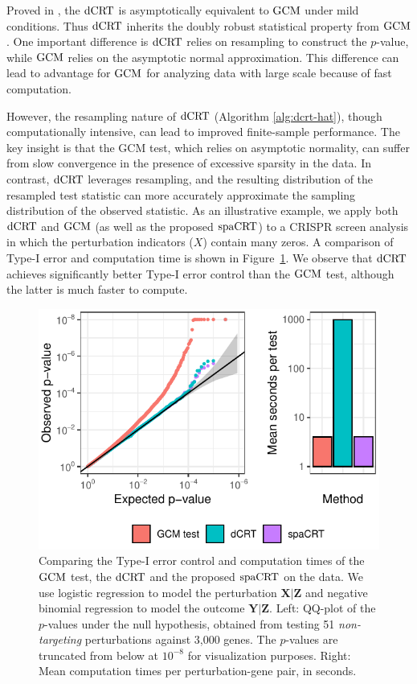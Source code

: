 \documentclass[12pt]{article}
\theoremstyle{definition}
\newcommand{\prx}{\bm X}								%
\newcommand{\prz}{\bm Z}								%
\newcommand{\pry}{{\bm Y}}								%
\newcommand{\dCRT}{\textnormal{dCRT}} 					%
\newcommand{\GCM}{\textnormal{GCM}}						%
\newcommand{\spacrt}{\textnormal{spaCRT}}               %
\begin{document}
Proved in \citet{Niu2022a}, the $\dCRT$ is asymptotically equivalent to $\GCM$ under mild conditions. Thus $\dCRT$ inherits the doubly robust statistical property from $\GCM$. One important difference is $\dCRT$ relies on resampling to construct the $p$-value, while $\GCM$ relies on the asymptotic normal approximation. This difference can lead to advantage for $\GCM$ for analyzing data with large scale because of fast computation. 

However, the resampling nature of $\dCRT$ (Algorithm \ref{alg:dcrt-hat}), though computationally intensive, can lead to improved finite-sample performance. The key insight is that the GCM test, which relies on asymptotic normality, can suffer from slow convergence in the presence of excessive sparsity in the data. In contrast, $\dCRT$ leverages resampling, and the resulting distribution of the resampled test statistic can more accurately approximate the sampling distribution of the observed statistic. As an illustrative example, we apply both $\dCRT$ and $\GCM$ (as well as the proposed $\spacrt$) to a CRISPR screen analysis in which the perturbation indicators ($X$) contain many zeros. A comparison of Type-I error and computation time is shown in Figure~\ref{fig:dCRT_GCM_binomial_poisson}. We observe that $\dCRT$ achieves significantly better Type-I error control than the $\GCM$ test, although the latter is much faster to compute.



\begin{figure}[h!]
	\centering
	\includegraphics{figures-and-tables/motivating_example.pdf} 
	\caption{Comparing the Type-I error control and computation times of the $\GCM$ test, the $\dCRT$ and the proposed $\spacrt$ on the \citet{Gasperini2019a} data. We use logistic regression to model the perturbation $\prx|\prz$ and negative binomial regression to model the outcome $\pry|\prz$. Left: QQ-plot of the $p$-values under the null hypothesis, obtained from testing 51 \textit{non-targeting} perturbations against 3,000 genes. The $p$-values are truncated from below at $10^{-8}$ for visualization purposes. Right: Mean computation times per perturbation-gene pair, in seconds.}
	\label{fig:dCRT_GCM_binomial_poisson} 
\end{figure}
\end{document}
